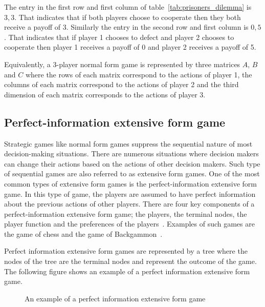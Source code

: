 The entry in the first row and first column of table~\ref{tab:prisoners_dilemma}
is \(3,3\).
That indicates that if both players choose to cooperate then they both receive
a payoff of 3.
Similarly the entry in the second row and first column is \(0,5\).
That indicates that if player 1 chooses to defect and player 2 chooses to
cooperate then player 1 receives a payoff of 0 and player 2 receives a payoff
of 5.

Equivalently, a 3-player normal form game is represented by three matrices
\(A\), \(B\) and \(C\) where the rows of each matrix correspond to the actions
of player 1, the columns of each matrix correspond to the actions of player 2
and the third dimension of each matrix corresponds to the actions of player 3.




\subsection{Perfect-information extensive form game}

Strategic games like normal form games suppress the sequential nature of most
decision-making situations.
There are numerous situations where decision makers can change their actions
based on the actions of other decision makers.
Such type of sequential games are also referred to as extensive form games.
One of the most common types of extensive form games is the perfect-information
extensive form game.
In this type of game, the players are assumed to have perfect information
about the previous actions of other
players.
There are four key components of a perfect-information extensive form game; the
players, the terminal nodes, the player function and the preferences of the
players~\cite{osborne2004}.
Examples of such games are the game of chess and the game of
Backgammon~\cite{hart1992games}.

Perfect information extensive form games are represented by a tree where the
nodes of the tree are the terminal nodes and represent the outcome of the
game.
The following figure shows an example of a perfect information extensive form
game.

\begin{figure}[H]
    \centering
    
    \caption{An example of a perfect information extensive form game}
    \label{fig:extensive_form_game}
\end{figure}

